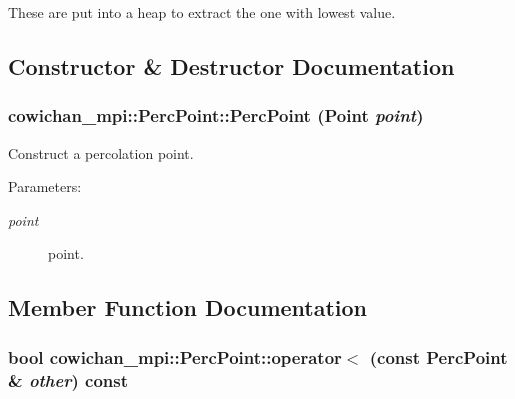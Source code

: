 These are put into a heap to extract the one with lowest value. 

\subsection{Constructor \& Destructor Documentation}
\hypertarget{classcowichan__mpi_1_1_perc_point_e2110cb8b13c9e1533a7e02dc40c5184}{
\subsubsection[{PercPoint}]{\setlength{\rightskip}{0pt plus 5cm}cowichan\_\-mpi::PercPoint::PercPoint ({\bf Point} {\em point})}}
\label{classcowichan__mpi_1_1_perc_point_e2110cb8b13c9e1533a7e02dc40c5184}


Construct a percolation point. \begin{Desc}
\item[Parameters:]
\begin{description}
\item[{\em point}]point. \end{description}
\end{Desc}


\subsection{Member Function Documentation}
\hypertarget{classcowichan__mpi_1_1_perc_point_b3a2db92dee14afdf3e9506251fdb162}{
\subsubsection[{operator$<$}]{\setlength{\rightskip}{0pt plus 5cm}bool cowichan\_\-mpi::PercPoint::operator$<$ (const {\bf PercPoint} \& {\em other}) const}}
\label{classcowichan__mpi_1_1_perc_point_b3a2db92dee14afdf3e9506251fdb162}


